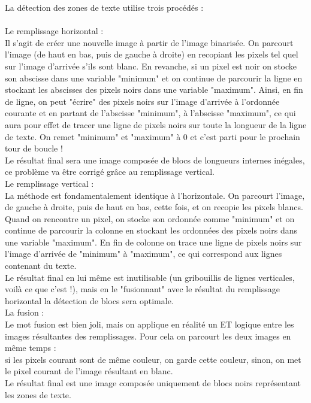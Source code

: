 \documentclass [french,12pt]{article}
\begin{document}
La détection des zones de texte utilise trois procédés :
\\
\\
Le remplissage horizontal :
\\
            Il s'agit de créer une nouvelle image à partir de l'image binarisée. On parcourt l'image (de haut en bas, puis de gauche à droite) en recopiant les pixels tel quel sur l'image d'arrivée s'ils sont blanc. En revanche, si un pixel est noir on stocke son abscisse dans une variable "minimum" et on continue de parcourir la ligne en stockant les abscisses des pixels noirs dans une variable "maximum". Ainsi, en fin de ligne, on peut "écrire" des pixels noirs sur l'image d'arrivée à l'ordonnée courante et en partant de l'abscisse "minimum", à l'abscisse "maximum", ce qui aura pour effet de tracer une ligne de pixels noirs sur toute la longueur de la ligne de texte. On remet "minimum" et "maximum" à 0 et c'est parti pour le prochain tour de boucle !
\\
	Le résultat final sera une image composée de blocs de longueurs internes inégales, ce problème va être corrigé grâce au remplissage vertical.
\\
Le remplissage vertical :
\\
            La méthode est fondamentalement identique à l'horizontale. On parcourt l'image, de gauche à droite, puis de haut en bas, cette fois, et on recopie les pixels blancs. Quand on rencontre un pixel, on stocke son ordonnée comme "minimum" et on continue de parcourir la colonne en stockant les ordonnées des pixels noirs dans une variable "maximum". En fin de colonne on trace une ligne de pixels noirs sur l'image d'arrivée de "minimum" à "maximum", ce qui correspond aux lignes contenant du texte. 
\\
            Le résultat final en lui même est inutilisable (un gribouillis de lignes verticales, voilà ce que c'est !), mais en le "fusionnant" avec le résultat du remplissage horizontal la détection de blocs sera optimale.
\\
La fusion :
\\
           Le mot fusion est bien joli, mais on applique en réalité un ET logique entre les images résultantes des remplissages.
           Pour cela on parcourt les deux images en même temps :
\\
                    si les pixels courant sont de même couleur, on garde cette couleur,
                    sinon, on met le pixel courant de l'image résultant en blanc.
\\
Le résultat final est une image composée uniquement de blocs noirs représentant les zones de texte.
\end{document}
